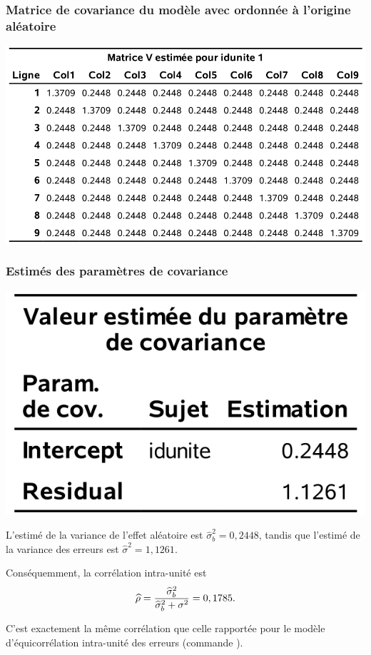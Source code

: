 \documentclass{beamer}
\begin{document}
\begin{frame}[fragile]
\frametitle{Matrice de covariance du modèle avec ordonnée à l'origine aléatoire}
\begin{center}
\includegraphics[width = 0.9\linewidth]{img/c6/diapos7-e11}

\end{center}
\end{frame}


\begin{frame}[fragile]
\frametitle{Estimés des paramètres de covariance}
\begin{center}
\includegraphics[width = 0.4\linewidth]{img/c6/diapos7-e12}
\end{center}
\bi
\item L'estimé de la variance de l'effet aléatoire est
$\hat{\sigma}^2_b=0,2448$, tandis que l'estimé de la variance des erreurs est
$\hat{\sigma}^2= 1,1261$.
\item Conséquemment, la corrélation intra-unité est
\begin{align*}
\hat{\rho}=\frac{\hat{\sigma}^2_b}{\hat{\sigma}^2_b+\sigma^2_{\vphantom{b}}}=0,1785.
\end{align*}

\item C'est exactement la même corrélation que celle rapportée pour le modèle d'équicorrélation intra-unité des erreurs (commande ).
\ei
\end{frame}
\end{document}
